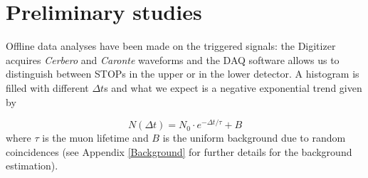\section{Preliminary studies}
Offline data analyses have been made on the triggered signals: the Digitizer acquires \emph{Cerbero} and \emph{Caronte} waveforms and the DAQ software allows us to distinguish between STOPs in the upper or in the lower detector. A histogram is filled with different $\Delta t$s and what we expect is a negative exponential trend given by

\begin{equation} \label{exp}
N(\Delta t) = N_0\cdot e^{-\Delta t/\tau} + B
\end{equation}
where $\tau$ is the muon lifetime and $B$ is the uniform background due to random coincidences (see Appendix \ref{Background} for further details for the background estimation). 

